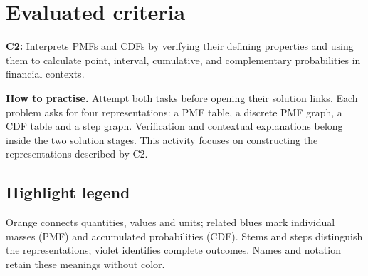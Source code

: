 \newcommand{\cTwoConnectionReading}{%
\textbf{How to read the stacked graphs.} The top graph shows the CDF and pale
dashed PMF shadows; the bottom graph shows the original blue PMF stems.
The plotting areas have identical horizontal limits, support ticks, numerical
spacing, widths and vertical scales. Stems show isolated masses, not positive
probability at every point along a segment. Each shadow represents a jump size:
it translates the mass vertically from $0$ to $\cTwoCDFHL{F_X(a^-)}$, keeping
its horizontal coordinate and physical length. Its top is $\cTwoCDFHL{F_X(a)}$, so
$\cTwoCDFHL{F_X(a)}-\cTwoCDFHL{F_X(a^-)}=\cTwoMassHL{p_X(a)}$.
Thin upward, parabolically curved arrows show correspondence from each bottom stem's midpoint
$(a,p_X(a)/2)$ to its top shadow's midpoint $(a,F_X(a^-)+p_X(a)/2)$,
including the smallest support value, where $F_X(a^-)=0$.
Their curved paths indicate correspondence, not additional probability values.
Shadows are neither extra masses nor extra CDF values at the cutoff.
CDF filled points give the included values; open points exclude the lower
heights. Pale shadow top dots sit behind the CDF endpoint markers.}


\maketitle
\section*{Evaluated criteria}
\textbf{C2:} Interprets PMFs and CDFs by verifying their defining properties and using them to calculate point, interval, cumulative, and complementary probabilities in financial contexts.

\textbf{How to practise.} Attempt both tasks before opening their solution links. Each problem asks for four representations: a PMF table, a discrete PMF graph, a CDF table and a step graph. Verification and contextual explanations belong inside the two solution stages. This activity focuses on constructing the representations described by C2.
\setcounter{tocdepth}{1}\setcounter{secnumdepth}{2}
\label{toc}\tableofcontents

\subsection*{Highlight legend}
\label{tab:highlight-legend}
\par\smallskip Orange connects quantities, values and units; related blues mark individual masses (PMF) and accumulated probabilities (CDF). Stems and steps distinguish the representations; violet identifies complete outcomes. Names and notation retain these meanings without color.

